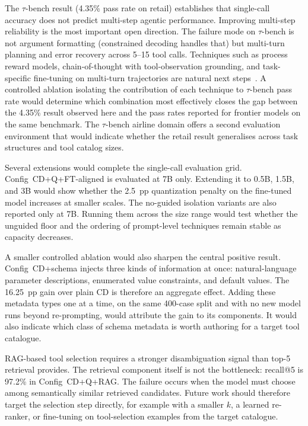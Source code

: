 The $\tau$-bench result (4.35\% pass rate on retail) establishes that
single-call accuracy does not predict multi-step agentic performance.
Improving multi-step reliability is the most important open direction.
The failure mode on $\tau$-bench is not argument formatting (constrained
decoding handles that) but multi-turn planning and error recovery across
5--15 tool calls. Techniques such as process reward models, chain-of-thought
with tool-observation grounding, and task-specific fine-tuning on multi-turn
trajectories are natural next steps~\cite{taubench2024}.
A controlled ablation isolating the contribution of each technique to
$\tau$-bench pass rate would determine which combination most effectively
closes the gap between the 4.35\% result observed here and the pass rates
reported for frontier models on the same benchmark.
The $\tau$-bench airline domain offers a second evaluation environment that
would indicate whether the retail result generalises across task structures
and tool catalog sizes.

Several extensions would complete the single-call evaluation grid. Config~CD+Q+FT-aligned is evaluated at 7B only. Extending it to 0.5B, 1.5B, and 3B would show whether the 2.5~pp quantization penalty on the fine-tuned model increases at smaller scales. The no-guided isolation variants are also reported only at 7B. Running them across the size range would test whether the unguided floor and the ordering of prompt-level techniques remain stable as capacity decreases.

A smaller controlled ablation would also sharpen the central positive result. Config~CD+schema injects three kinds of information at once: natural-language parameter descriptions, enumerated value constraints, and default values. The 16.25~pp gain over plain CD is therefore an aggregate effect. Adding these metadata types one at a time, on the same 400-case split and with no new model runs beyond re-prompting, would attribute the gain to its components. It would also indicate which class of schema metadata is worth authoring for a target tool catalogue.

RAG-based tool selection requires a stronger disambiguation signal than top-5 retrieval provides. The retrieval component itself is not the bottleneck: recall@5 is 97.2\% in Config~CD+Q+RAG. The failure occurs when the model must choose among semantically similar retrieved candidates. Future work should therefore target the selection step directly, for example with a smaller $k$, a learned re-ranker, or fine-tuning on tool-selection examples from the target catalogue.

